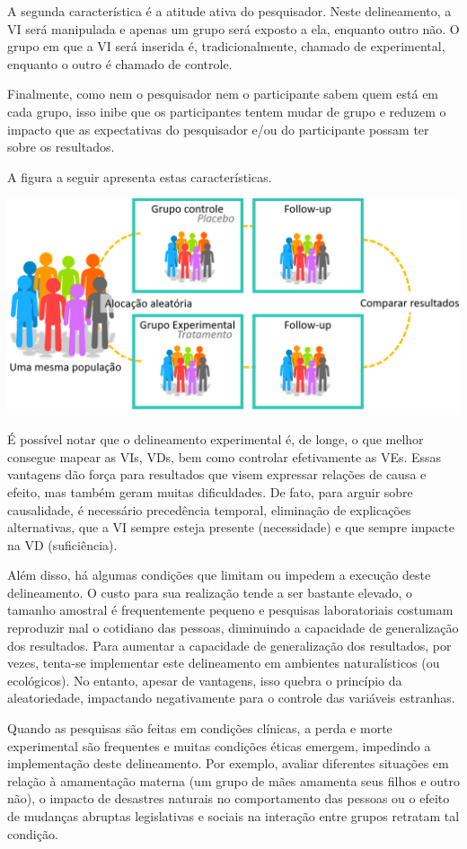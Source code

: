 \documentclass[
]{book}
\begin{document}
A segunda característica é a atitude ativa do pesquisador. Neste delineamento, a VI será manipulada e apenas um grupo será exposto a ela, enquanto outro não. O grupo em que a VI será inserida é, tradicionalmente, chamado de experimental, enquanto o outro é chamado de controle.

Finalmente, como nem o pesquisador nem o participante sabem quem está em cada grupo, isso inibe que os participantes tentem mudar de grupo e reduzem o impacto que as expectativas do pesquisador e/ou do participante possam ter sobre os resultados.

A figura a seguir apresenta estas características.

\includegraphics{./img/cap_experimento.png}

É possível notar que o delineamento experimental é, de longe, o que melhor consegue mapear as VIs, VDs, bem como controlar efetivamente as VEs. Essas vantagens dão força para resultados que visem expressar relações de causa e efeito, mas também geram muitas dificuldades. De fato, para arguir sobre causalidade, é necessário precedência temporal, eliminação de explicações alternativas, que a VI sempre esteja presente (necessidade) e que sempre impacte na VD (suficiência).

Além disso, há algumas condições que limitam ou impedem a execução deste delineamento. O custo para sua realização tende a ser bastante elevado, o tamanho amostral é frequentemente pequeno e pesquisas laboratoriais costumam reproduzir mal o cotidiano das pessoas, diminuindo a capacidade de generalização dos resultados. Para aumentar a capacidade de generalização dos resultados, por vezes, tenta-se implementar este delineamento em ambientes naturalísticos (ou ecológicos). No entanto, apesar de vantagens, isso quebra o princípio da aleatoriedade, impactando negativamente para o controle das variáveis estranhas.

Quando as pesquisas são feitas em condições clínicas, a perda e morte experimental são frequentes e muitas condições éticas emergem, impedindo a implementação deste delineamento. Por exemplo, avaliar diferentes situações em relação à amamentação materna (um grupo de mães amamenta seus filhos e outro não), o impacto de desastres naturais no comportamento das pessoas ou o efeito de mudanças abruptas legislativas e sociais na interação entre grupos retratam tal condição.
\end{document}
